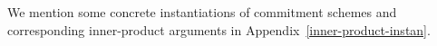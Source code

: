 We mention some concrete instantiations of  commitment schemes and corresponding inner-product arguments in Appendix~\ref{inner-product-instan}. 


 
%
